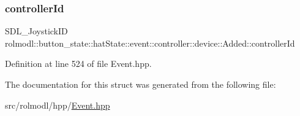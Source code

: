 \subsubsection{\texorpdfstring{controllerId}{controllerId}}
{\footnotesize\ttfamily S\+D\+L\+\_\+\+Joystick\+ID rolmodl\+::button\+\_\+state\+::hat\+State\+::event\+::controller\+::device\+::\+Added\+::controller\+Id}



Definition at line 524 of file Event.\+hpp.



The documentation for this struct was generated from the following file\+:\begin{DoxyCompactItemize}
\item 
src/rolmodl/hpp/\mbox{\hyperlink{_event_8hpp}{Event.\+hpp}}\end{DoxyCompactItemize}
